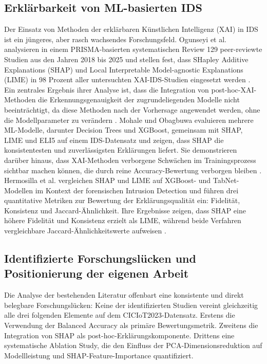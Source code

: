 \subsection{Erklärbarkeit von ML-basierten IDS}
Der Einsatz von Methoden der erklärbaren Künstlichen Intelligenz (XAI) in IDS ist ein jüngeres, aber rasch wachsendes Forschungsfeld. Ogunseyi et al. \cite{ogunseyi2026xai_review} analysieren in einem PRISMA-basierten systematischen Review 129 peer-reviewte Studien aus den Jahren 2018 bis 2025 und stellen fest, dass SHapley Additive Explanations (SHAP) und Local Interpretable Model-agnostic Explanations (LIME) in 98 Prozent aller untersuchten XAI-IDS-Studien eingesetzt werden \cite{ogunseyi2026xai_review}. Ein zentrales Ergebnis ihrer Analyse ist, dass die Integration von post-hoc-XAI-Methoden die Erkennungsgenauigkeit der zugrundeliegenden Modelle nicht beeinträchtigt, da diese Methoden nach der Vorhersage angewendet werden, ohne die Modellparameter zu verändern \cite{ogunseyi2026xai_review}. Mohale und Obagbuwa \cite{mohale2025xai} evaluieren mehrere ML-Modelle, darunter Decision Trees und XGBoost, gemeinsam mit SHAP, LIME und ELI5 auf einem IDS-Datensatz und zeigen, dass SHAP die konsistentesten und zuverlässigsten Erklärungen liefert. Sie demonstrieren darüber hinaus, dass XAI-Methoden verborgene Schwächen im Trainingsprozess sichtbar machen können, die durch reine Accuracy-Bewertung verborgen bleiben \cite{mohale2025xai}. Hermosilla et al. \cite{hermosilla2025xai_forensic} vergleichen SHAP und LIME auf XGBoost- und TabNet-Modellen im Kontext der forensischen Intrusion Detection und führen drei quantitative Metriken zur Bewertung der Erklärungsqualität ein: Fidelität, Konsistenz und Jaccard-Ähnlichkeit. Ihre Ergebnisse zeigen, dass SHAP eine höhere Fidelität und Konsistenz erzielt als LIME, während beide Verfahren vergleichbare Jaccard-Ähnlichkeitswerte aufweisen \cite{hermosilla2025xai_forensic}.

\subsection{Identifizierte Forschungslücken und Positionierung der eigenen Arbeit}
Die Analyse der bestehenden Literatur offenbart eine konsistente und direkt belegbare Forschungslücken: Keine der identifizierten Studien vereint gleichzeitig alle drei folgenden Elemente auf dem CICIoT2023-Datensatz. Erstens die Verwendung der Balanced Accuracy als primäre Bewertungsmetrik. Zweitens die Integration von SHAP als post-hoc-Erklärungskomponente. Drittens eine systematische Ablation Study, die den Einfluss der PCA-Dimensionsreduktion auf Modellleistung und SHAP-Feature-Importance quantifiziert.

